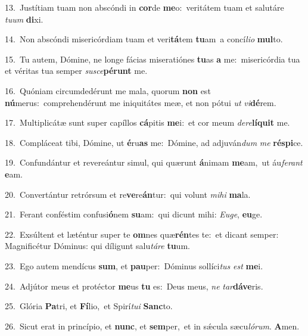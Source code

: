 {\numbfont\textcolor{\numbcolor}{13.}}~Justítiam tuam non abscóndi in \textbf{cor}\-de \textbf{me}\-o:~\star veritátem tuam et salutáre \textit{tu}\-\textit{um} \textbf{di}\-xi.\par
{\numbfont\textcolor{\numbcolor}{14.}}~Non abscóndi misericórdiam tuam et veri\-\textbf{tá}\-tem \textbf{tu}\-am~\star a concí\-\textit{li}\-\textit{o} \textbf{mul}\-to.\par
{\numbfont\textcolor{\numbcolor}{15.}}~Tu autem, Dómine, ne longe fácias miseratiónes \textbf{tu}\-as \textbf{a} me:~\star misericórdia tua et véritas tua semper \textit{su}\-\textit{sce}\textbf{pé}\textbf{runt} me.\par
{\numbfont\textcolor{\numbcolor}{16.}}~Quóniam circumdedérunt me mala, quorum \textbf{non} est \textbf{nú}\-merus:~\star comprehendérunt me iniquitátes meæ, et non pótui \textit{ut} \textit{vi}\-\textbf{dé}rem.\par
{\numbfont\textcolor{\numbcolor}{17.}}~Multiplicátæ sunt super capíllos \textbf{cá}\-pitis \textbf{me}\-i:~\star et cor meum \textit{de}\-\textit{re}\textbf{lí}\textbf{quit} me.\par
{\numbfont\textcolor{\numbcolor}{18.}}~Compláceat tibi, Dómine, ut \textbf{é}\-ru\textbf{as} me:~\star Dómine, ad adjuván\textit{dum} \textit{me} \textbf{ré}\-\textbf{spi}ce.\par
{\numbfont\textcolor{\numbcolor}{19.}}~Confundántur et revereántur simul, qui quærunt \textbf{á}\-nimam \textbf{me}\-am,~\star ut áu\-\textit{fe}\-\textit{rant} \textbf{e}\-am.\par
{\numbfont\textcolor{\numbcolor}{20.}}~Convertántur retrórsum et re\-\textbf{ve}\-re\-\textbf{án}\-tur:~\star qui volunt \textit{mi}\-\textit{hi} \textbf{ma}\-la.\par
{\numbfont\textcolor{\numbcolor}{21.}}~Ferant conféstim confusi\-\textbf{ó}\-nem \textbf{su}\-am:~\star qui dicunt mihi: \textit{Eu}\-\textit{ge}, \textbf{eu}\-ge.\par
{\numbfont\textcolor{\numbcolor}{22.}}~Exsúltent et læténtur super te \textbf{om}\-nes quæ\-\textbf{rén}\-tes te:~\star et dicant semper: Magnificétur Dóminus: qui díligunt salu\-\textit{tá}\-\textit{re} \textbf{tu}\-um.\par
{\numbfont\textcolor{\numbcolor}{23.}}~Ego autem mendícus \textbf{sum}\-, et \textbf{pau}\-per:~\star Dóminus sollíci\textit{tus} \textit{est} \textbf{me}\-i.\par
{\numbfont\textcolor{\numbcolor}{24.}}~Adjútor meus et protéctor \textbf{me}\-us \textbf{tu} es:~\star Deus meus, \textit{ne} \textit{tar}\-\textbf{dá}\textbf{ve}ris.\par
{\numbfont\textcolor{\numbcolor}{25.}}~Glória \textbf{Pa}\-tri, et \textbf{Fí}\-lio,~\star et Spirí\-\textit{tu}\-\textit{i} \textbf{Sanc}\-to.\par
{\numbfont\textcolor{\numbcolor}{26.}}~Sicut erat in princípio, et \textbf{nunc}\-, et \textbf{sem}\-per,~\star et in sǽcula sæcu\-\textit{ló}\-\textit{rum}. \textbf{A}\-men.\par
